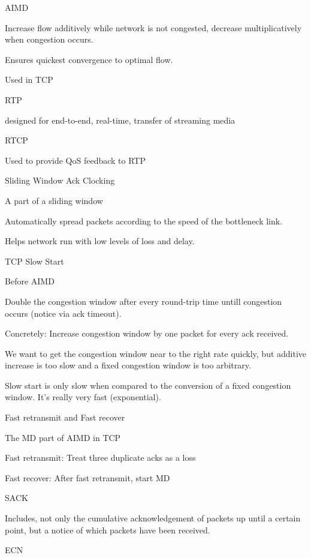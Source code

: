 \documentclass[main.tex]{subfiles}
\begin{document}
\begin{card}{AIMD}
\item Increase flow additively while network is not congested, decrease multiplicatively when congestion occurs.
\item Ensures quickest convergence to optimal flow.
\item Used in TCP
\end{card}

\begin{card}{RTP}
\item designed for end-to-end, real-time, transfer of streaming media
\end{card}

\begin{card}{RTCP}
\item Used to provide QoS feedback to RTP
\end{card}

\begin{card}{Sliding Window Ack Clocking}
\item A part of a sliding window
\item Automatically spread packets according to the speed of the bottleneck link.
\item Helps network run with low levels of loss and delay.
\end{card}

\begin{card}{TCP Slow Start}
\item Before AIMD
\item Double the congestion window after every round-trip time untill congestion occurs (notice via ack timeout).
\item Concretely: Increase congestion window by one packet for every ack received.
\item We want to get the congestion window near to the right rate quickly, but additive increase is too slow and a fixed congestion window is too arbitrary.
\item Slow start is only slow when compared to the conversion of a fixed congestion window. It's really very fast (exponential).
\end{card}

\begin{card}{Fast retransmit and Fast recover}
\item The MD part of AIMD in TCP
\item Fast retransmit: Treat three duplicate acks as a loss
\item Fast recover: After fast retransmit, start MD
\end{card}

\begin{card}{SACK}
\item Includes, not only the cumulative acknowledgement of packets up until a certain point, but a notice of which packets have been received.
\end{card}

\begin{card}{ECN}
\TODO
\end{card}
\end{document}
